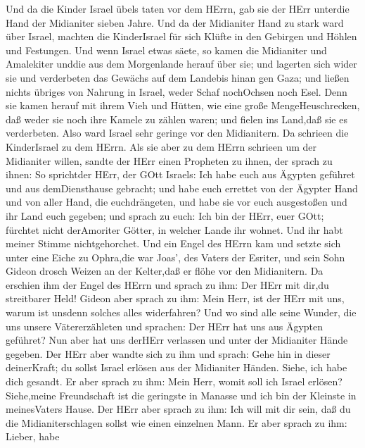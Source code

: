  Und da die Kinder Israel übels taten vor dem HErrn, gab sie
der HErr unterdie Hand der Midianiter sieben Jahre.  Und da
der Midianiter Hand zu stark ward über Israel, machten die KinderIsrael
für sich Klüfte in den Gebirgen und Höhlen und Festungen. 
Und wenn Israel etwas säete, so kamen die Midianiter und Amalekiter
unddie aus dem Morgenlande herauf über sie;  und lagerten
sich wider sie und verderbeten das Gewächs auf dem Landebis hinan gen
Gaza; und ließen nichts übriges von Nahrung in Israel, weder Schaf
nochOchsen noch Esel.  Denn sie kamen herauf mit ihrem Vieh
und Hütten, wie eine große MengeHeuschrecken, daß weder sie noch ihre
Kamele zu zählen waren; und fielen ins Land,daß sie es verderbeten.
 Also ward Israel sehr geringe vor den Midianitern. Da
schrieen die KinderIsrael zu dem HErrn.  Als sie aber zu dem
HErrn schrieen um der Midianiter willen,  sandte der HErr
einen Propheten zu ihnen, der sprach zu ihnen: So sprichtder HErr, der
GOtt Israels: Ich habe euch aus Ägypten geführet und aus demDiensthause
gebracht;  und habe euch errettet von der Ägypter Hand und
von aller Hand, die euchdrängeten, und habe sie vor euch ausgestoßen und
ihr Land euch gegeben;  und sprach zu euch: Ich bin der
HErr, euer GOtt; fürchtet nicht derAmoriter Götter, in welcher Lande ihr
wohnet. Und ihr habt meiner Stimme nichtgehorchet.  Und ein
Engel des HErrn kam und setzte sich unter eine Eiche zu Ophra,die war
Joas', des Vaters der Esriter, und sein Sohn Gideon drosch Weizen an der
Kelter,daß er flöhe vor den Midianitern.  Da erschien ihm
der Engel des HErrn und sprach zu ihm: Der HErr mit dir,du streitbarer
Held!  Gideon aber sprach zu ihm: Mein Herr, ist der HErr
mit uns, warum ist unsdenn solches alles widerfahren? Und wo sind alle
seine Wunder, die uns unsere Vätererzähleten und sprachen: Der HErr hat
uns aus Ägypten geführet? Nun aber hat uns derHErr verlassen und unter
der Midianiter Hände gegeben.  Der HErr aber wandte sich zu
ihm und sprach: Gehe hin in dieser deinerKraft; du sollst Israel erlösen
aus der Midianiter Händen. Siehe, ich habe dich gesandt. 
Er aber sprach zu ihm: Mein Herr, womit soll ich Israel erlösen?
Siehe,meine Freundschaft ist die geringste in Manasse und ich bin der
Kleinste in meinesVaters Hause.  Der HErr aber sprach zu
ihm: Ich will mit dir sein, daß du die Midianiterschlagen sollst wie
einen einzelnen Mann.  Er aber sprach zu ihm: Lieber, habe
